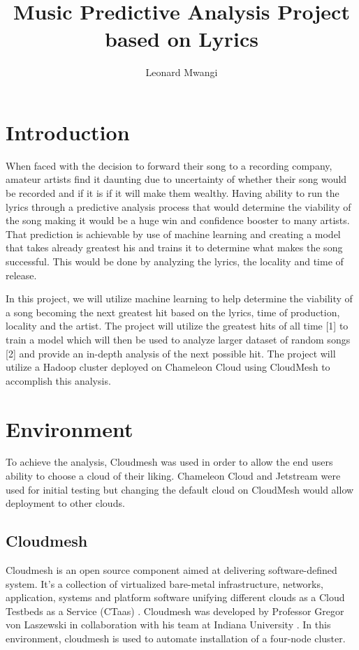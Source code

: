 \documentclass[9pt,twocolumn,twoside]{../../styles/osajnl}
\title{Music Predictive Analysis Project based on Lyrics}
\author[1,*]{Leonard Mwangi}
\affil[1]{School of Informatics and Computing, Bloomington, IN 47408, U.S.A.}
\affil[*]{Corresponding authors: lmwangi@iu.edu}
\begin{document}
\maketitle

\section{Introduction}
When faced with the decision to forward their song to a recording
company, amateur artists find it daunting due to uncertainty of
whether their song would be recorded and if it is if it will make them
wealthy.  Having ability to run the lyrics through a predictive
analysis process that would determine the viability of the song making
it would be a huge win and confidence booster to many artists. That
prediction is achievable by use of machine learning and creating a
model that takes already greatest his and trains it to determine what
makes the song successful. This would be done by analyzing the lyrics,
the locality and time of release.

In this project, we will utilize machine learning to help determine
the viability of a song becoming the next greatest hit based on the
lyrics, time of production, locality and the artist. The project will
utilize the greatest hits of all time [1] to train a model which will
then be used to analyze larger dataset of random songs [2] and provide
an in-depth analysis of the next possible hit. The project will
utilize a Hadoop cluster deployed on Chameleon Cloud using CloudMesh
to accomplish this analysis.

\section{Environment}

To achieve the analysis, Cloudmesh was used in order to allow the end
users ability to choose a cloud of their liking. Chameleon Cloud and
Jetstream were used for initial testing but changing the default cloud
on CloudMesh would allow deployment to other clouds.

\subsection{Cloudmesh}

Cloudmesh is an open source component aimed at delivering
software-defined system. It’s a collection of virtualized bare-metal
infrastructure, networks, application, systems and platform software
unifying different clouds as a Cloud Testbeds as a Service (CTaas)
\cite{cloudmesh}. Cloudmesh was developed by Professor Gregor von
Laszewski in collaboration with his team at Indiana University \cite{multipleclouds}. In this environment, cloudmesh is used to
automate installation of a four-node cluster.
\end{document}
